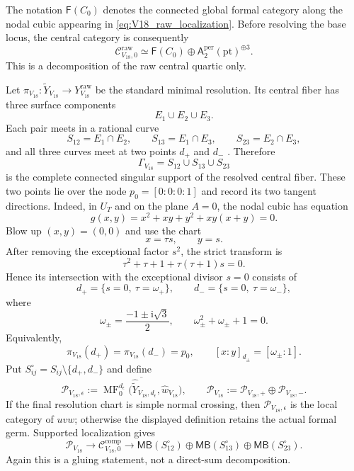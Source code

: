 \documentclass[11pt]{amsart}
\theoremstyle{definition}
\theoremstyle{remark}
\DeclareMathOperator{\MF}{MF}
\newcommand{\MBcat}[1]{\mathsf{MB}(#1)}
\newcommand{\Aper}[2]{\mathsf{A}^{\mathrm{per}}_{#2}(#1)}
\newcommand{\FormalCat}[1]{\mathsf{F}(#1)}
\newcommand{\CcompV}{\mathcal C^{\mathrm{comp}}_{V_{18},0}}
\newcommand{\CrawV}{\mathcal C^{\mathrm{raw}}_{V_{18},0}}
\begin{document}
The notation $\FormalCat{C_0}$ denotes the connected global formal category
along the nodal cubic appearing in
\eqref{eq:V18_raw_localization}.  Before resolving the base locus, the central
category is consequently
\begin{equation}
\label{eq:V18_raw_category}
\CrawV
\simeq
\FormalCat{C_0}
\oplus
\Aper{\mathrm{pt}}{2}^{\oplus3}.
\end{equation}
This is a decomposition of the raw central quartic only.

Let $\pi_{V_{18}}:\widetilde Y_{V_{18}}\to
Y^{\mathrm{raw}}_{V_{18}}$ be the standard minimal resolution.  Its central
fiber has three surface components
\[
E_1\cup E_2\cup E_3.
\]
Each pair meets in a rational curve
\[
S_{12}=E_1\cap E_2,
\qquad
S_{13}=E_1\cap E_3,
\qquad
S_{23}=E_2\cap E_3,
\]
and all three curves meet at two points $d_+$ and $d_-$
\cite{PrzyjalkowskiHodge}.  Therefore
\[
\Gamma_{V_{18}}=S_{12}\cup S_{13}\cup S_{23}
\]
is the complete connected singular support of the resolved central fiber.
These two points lie over the node $p_0=[0:0:0:1]$ and record its two tangent
directions.  Indeed, in $U_T$ and on the plane $A=0$, the nodal cubic has
equation
\[
g(x,y)=x^2+xy+y^2+xy(x+y)=0.
\]
Blow up $(x,y)=(0,0)$ and use the chart
\[
x=\tau s,\qquad y=s.
\]
After removing the exceptional factor $s^2$, the strict transform is
\[
\tau^2+\tau+1+\tau(\tau+1)s=0.
\]
Hence its intersection with the exceptional divisor $s=0$ consists of
\[
d_+=\{s=0,\ \tau=\omega_+\},
\qquad
d_-=\{s=0,\ \tau=\omega_-\},
\]
where
\[
\omega_\pm=\frac{-1\pm\mathrm i\sqrt3}{2},
\qquad
\omega_\pm^2+\omega_\pm+1=0.
\]
Equivalently,
\[
\pi_{V_{18}}(d_+)=\pi_{V_{18}}(d_-)=p_0,
\qquad
[x:y]_{d_\pm}=[\omega_\pm:1].
\]
Put $S_{ij}^{\circ}=S_{ij}\setminus\{d_+,d_-\}$ and define
\[
\mathcal P_{V_{18},\epsilon}
:=
\overline{\MF^{d_\epsilon}_0
\bigl(\widehat{\widetilde Y}_{V_{18},d_\epsilon},
\widehat w_{V_{18}}\bigr)},
\qquad
\mathcal P_{V_{18}}
:=
\mathcal P_{V_{18},+}\oplus\mathcal P_{V_{18},-}.
\]
If the final resolution chart is simple normal crossing, then
$\mathcal P_{V_{18},\epsilon}$ is the local category of $uvw$; otherwise the
displayed definition retains the actual formal germ.  Supported localization
gives
\begin{equation}
\label{eq:V18_resolved_localization}
\mathcal P_{V_{18}}
\longrightarrow
\CcompV
\longrightarrow
\MBcat{S_{12}^{\circ}}
\oplus\MBcat{S_{13}^{\circ}}
\oplus\MBcat{S_{23}^{\circ}}.
\end{equation}
Again this is a gluing statement, not a direct-sum decomposition.
\end{document}
